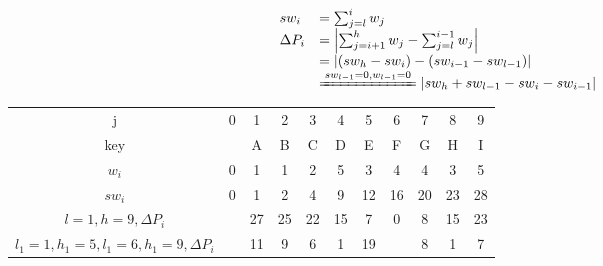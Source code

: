 \documentclass[UTF8]{ctexart}
\newcommand{\mfa}[1]{\left| #1\right|}
\newcommand{\ma}[1]{\begin{array}{llll} #1 \end{array}}
\newcommand{\meq}[2]{\xlongequal[#2]{#1}}
\begin{document}
$$\ma{sw_i &=\sum_{j=l}^i w_j\\
\Delta P_i &=\mfa{\sum_{j=i+1}^h w_j -\sum_{j=l}^{i-1}w_j}\\
           &=\mfa{(sw_h-sw_i)-(sw_{i-1}-sw_{l-1})}\\
           &\meq{sw_{l-1}=0,w_{l-1}=0}{}\mfa{sw_h+sw_{l-1}-sw_i-sw_{i-1}}
}$$
\begin{center}
    \begin{small}
        \begin{tabular}[b]{ccccccccccc}
            \toprule
            j & 0 & 1 & 2  & 3& 4& 5& 6& 7& 8& 9 \\
            key &  & A & B  &C & D& E& F& G& H& I \\
            \midrule
            $w_i$        & 0 & 1 &1 &2 &5 &3 &4 &4 &3 &5  \\
            $sw_i$       & 0 & 1 &2 &4 &9 &12 &16 &20 &23 &28 \\
            $l=1,h=9,\Delta P_i$  & &27 &25 &22 &15 &7 &0 &8 &15 &23 \\
            $l_1=1,h_1=5,l_1=6,h_1=9,\Delta P_i$  & &11 &9 &6 &1 &19 &  &8 &1 &7  \\
            \bottomrule
        \end{tabular} 
    \end{small}
\end{center}
\end{document}
